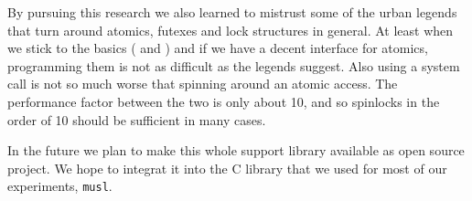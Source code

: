 By pursuing this research we also learned to mistrust some of the
urban legends that turn around atomics, futexes and lock structures in
general. At least when we stick to the basics ( and
) and if we have a decent interface for atomics,
programming them is not as difficult as the legends suggest. Also
using a system call is not so much worse that spinning around an
atomic access. The performance factor between the two is only about
10, and so spinlocks in the order of 10 should be sufficient in many
cases.

In the future we plan to make this whole support library available as
open source project. We hope to integrat it into the C library that we
used for most of our experiments, \texttt{musl}.


